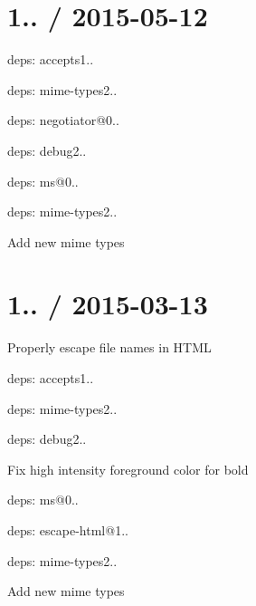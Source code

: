 \section*{1.. / 2015-\/05-\/12 }


\begin{DoxyItemize}
\item deps\+: accepts1..
\begin{DoxyItemize}
\item deps\+: mime-\/types2..
\item deps\+: negotiator@0..
\end{DoxyItemize}
\item deps\+: debug2..
\begin{DoxyItemize}
\item deps\+: ms@0..
\end{DoxyItemize}
\item deps\+: mime-\/types2..
\begin{DoxyItemize}
\item Add new mime types
\end{DoxyItemize}
\end{DoxyItemize}

\section*{1.. / 2015-\/03-\/13 }


\begin{DoxyItemize}
\item Properly escape file names in H\+T\+ML
\item deps\+: accepts1..
\begin{DoxyItemize}
\item deps\+: mime-\/types2..
\end{DoxyItemize}
\item deps\+: debug2..
\begin{DoxyItemize}
\item Fix high intensity foreground color for bold
\item deps\+: ms@0..
\end{DoxyItemize}
\item deps\+: escape-\/html@1..
\item deps\+: mime-\/types2..
\begin{DoxyItemize}
\item Add new mime types
\end{DoxyItemize}
\end{DoxyItemize}

